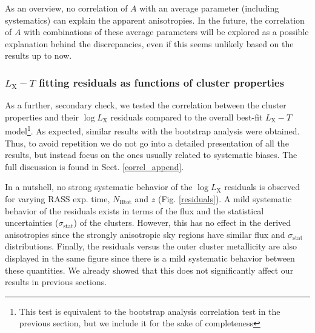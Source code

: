 \documentclass{aa}   %
\begin{document}
As an overview, no correlation of $A$ with an average parameter (including systematics) can explain the apparent anisotropies. In the future, the correlation of $A$ with combinations of these average parameters will be explored as a possible explanation behind the discrepancies, even if this seems unlikely based on the results up to now.


\subsubsection{$L_{\text{X}}-T$ fitting residuals as functions of cluster properties}\label{corr_resid}

As a further, secondary check, we tested the correlation between the cluster properties and their $\log{L_{\text{X}}}$ residuals compared to the overall best-fit $L_{\text{X}}-T$ model\footnote{This test is equivalent to the bootstrap analysis correlation test in the previous section, but we include it for the sake of completeness}. As expected, similar results with the bootstrap analysis were obtained. Thus, to avoid repetition we do not go into a detailed presentation of all the results, but instead focus on the ones usually related to systematic biases. The full discussion is found in Sect. \ref{correl_append}. 



In a nutshell, no strong systematic behavior of the $\log{L_{\text{X}}}$ residuals is observed for varying RASS exp. time, $N_{\text{Htot}}$ and $z$ (Fig. \ref{residuals}). A mild systematic behavior of the residuals exists in terms of the flux and the statistical uncertainties ($\sigma_{\text{stat}}$) of the clusters. However, this has no effect in the derived anisotropies since the strongly anisotropic sky regions have similar flux and $\sigma_{\text{stat}}$ distributions. Finally, the residuals versus the outer cluster metallicity are also displayed in the same figure since there is a mild systematic behavior between these quantities. We already showed that this does not significantly affect our results in previous sections.
\end{document}
